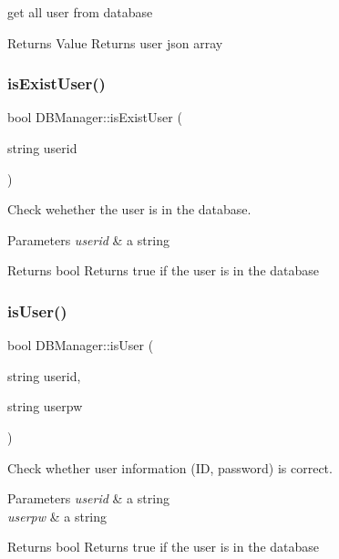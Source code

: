 get all user from database 

\begin{DoxyReturn}{Returns}
Value Returns user json array 
\end{DoxyReturn}
\mbox{\label{class_d_b_manager_ae4df9e089ce729370abd432af32ab0a5}} 
\subsubsection{\texorpdfstring{is\+Exist\+User()}{isExistUser()}}
{\footnotesize\ttfamily bool D\+B\+Manager\+::is\+Exist\+User (\begin{DoxyParamCaption}\item[{string}]{userid }\end{DoxyParamCaption})}



Check wehether the user is in the database. 


\begin{DoxyParams}{Parameters}
{\em userid} & a string \\
\hline
\end{DoxyParams}
\begin{DoxyReturn}{Returns}
bool Returns true if the user is in the database 
\end{DoxyReturn}
\mbox{\label{class_d_b_manager_a3fb201b447281395526cc71e8c408051}} 
\subsubsection{\texorpdfstring{is\+User()}{isUser()}}
{\footnotesize\ttfamily bool D\+B\+Manager\+::is\+User (\begin{DoxyParamCaption}\item[{string}]{userid,  }\item[{string}]{userpw }\end{DoxyParamCaption})}



Check whether user information (ID, password) is correct. 


\begin{DoxyParams}{Parameters}
{\em userid} & a string \\
\hline
{\em userpw} & a string \\
\hline
\end{DoxyParams}
\begin{DoxyReturn}{Returns}
bool Returns true if the user is in the database 
\end{DoxyReturn}
\mbox{\label{class_d_b_manager_a0af0724f0b21b7e33062b93bd700ded6}} 
